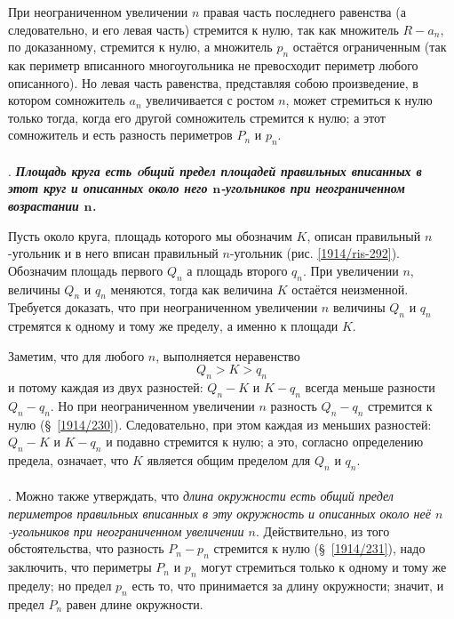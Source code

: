 При неограниченном увеличении $n$ правая часть последнего равенства (а следовательно, и его левая часть) стремится к нулю, так как множитель $R-a_n$, по доказанному, стремится к нулю, а множитель $p_n$ остаётся ограниченным (так как периметр вписанного многоугольника не превосходит периметр любого описанного).
Но левая часть равенства, представляя собою произведение, в котором сомножитель $a_n$ увеличивается с ростом $n$, может стремиться к нулю только тогда, когда его другой сомножитель  стремится к нулю;
а этот сомножитель и есть разность периметров $P_n$ и $p_n$.

\paragraph{}\label{1914/232} . \textbf{\emph{Площадь круга есть oбщий предел площадей правильных вписанных в этот круг и описанных около него $\bm{n}$-угольников при неограниченном возрастании $\bm{n}$.}}

Пусть около круга, площадь которого мы обозначим $K$, описан правильный $n$-угольник и в него вписан правильный $n$-угольник (рис. \ref{1914/ris-292}).
Обозначим площадь первого $Q_n$ а площадь второго $q_n$.
При увеличении $n$, величины $Q_n$ и $q_n$ меняются, тогда как величина $K$ остаётся неизменной.
Требуется доказать, что при неограниченном увеличении $n$ величины $Q_n$ и $q_n$ стремятся к одному
и тому же пределу, а именно к площади $K$.

Заметим, что для любого $n$, выполняется неравенство 
\[Q_n>K>q_n\]
и потому каждая из двух разностей: 
$Q_n-K$ и $K-q_n$ всегда меньше разности $Q_n-q_n$.
Но при неограниченном увеличении $n$ разность $Q_n-q_n$ стремится к нулю (§~\ref{1914/230}).
Следовательно, при этом каждая из меньших разностей: $Q_n-K$ и $K-q_n$ и подавно стремится к нулю;
а это, согласно определению предела, означает, что $K$ является общим пределом для $Q_n$ и $q_n$.

\paragraph{}\label{1914/233} .
Можно также утверждать, что \emph{длина окружности есть общий предел периметров правильных вписанных в эту окружность и описанных около неё $n$-угольников при неограниченном увеличении $n$}.
Действительно, из того обстоятельства, что разность $P_n-p_n$ стремится к нулю (§~\ref{1914/231}), надо заключить, что периметры $P_n$ и $p_n$ могут стремиться только к одному и тому же пределу;
но предел $p_n$ есть то, что принимается за длину окружности;
значит, и предел $P_n$ равен длине окружности.


